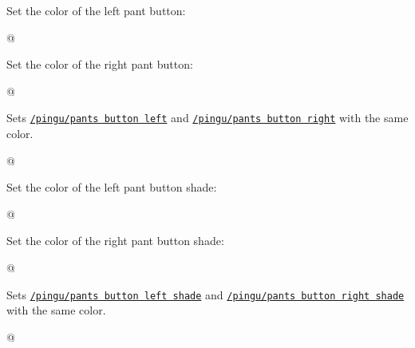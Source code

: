 \documentclass[parskip=half,english,numbers=noenddot,footnotes=nomultiple,oneside]{scrartcl}
\def\lpingu#1{\lstinline[style=lstpingu,language=pingulang]'#1'}
\newcommand*\keyref[2][/pingu/]{\hyperref[pk:#1#2]{\lpingu{#1#2}}}
\begin{document}
Set the color of the left pant button:
\begin{tcblisting}{@}
\begin{tikzpicture}
	\pingu[pants, pants button left=green]
\end{tikzpicture}
\end{tcblisting}
\endsubkeyexplain

Set the color of the right pant button:
\begin{tcblisting}{@}
\begin{tikzpicture}
	\pingu[pants, pants button right=green]
\end{tikzpicture}
\end{tcblisting}
\endsubkeyexplain

Sets \keyref{pants button left} and \keyref{pants button right} with the same color.
\begin{tcblisting}{@}
\begin{tikzpicture}
	\pingu[pants, pants buttons=green]
\end{tikzpicture}
\end{tcblisting}
\endsubkeyexplain

{\def\pingu@color@pants@button@left{<left-button-color>}%
Set the color of the left pant button shade:
\begin{tcblisting}{@}
\begin{tikzpicture}
	\pingu[pants,
	       pants button left shade=green]
\end{tikzpicture}
\end{tcblisting}
\endsubkeyexplain}

{\def\pingu@color@pants@button@left{<right-button-color>}%
Set the color of the right pant button shade:
\begin{tcblisting}{@}
\begin{tikzpicture}
	\pingu[pants,
	       pants button right shade=green]
\end{tikzpicture}
\end{tcblisting}
\endsubkeyexplain}

{\def\pingu@color@pants@button@left{<left-button-color>}%
Sets \keyref{pants button left shade} and \keyref{pants button right shade} with the same color.
\begin{tcblisting}{@}
\begin{tikzpicture}
	\pingu[pants, pants buttons shade=green]
\end{tikzpicture}
\end{tcblisting}
\endsubkeyexplain}
\end{document}

